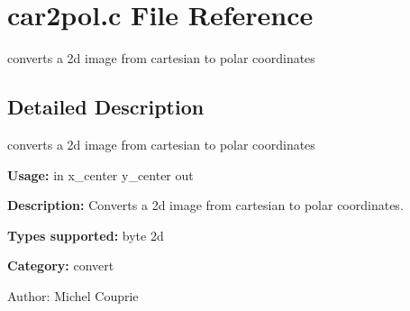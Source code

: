 \section{car2pol.c File Reference}
\label{car2pol_8c}
converts a 2d image from cartesian to polar coordinates 



\subsection{Detailed Description}
converts a 2d image from cartesian to polar coordinates 

{\bf Usage:} in x\_\-center y\_\-center out

{\bf Description:} Converts a 2d image from cartesian to polar coordinates.

{\bf Types supported:} byte 2d

{\bf Category:} convert

\begin{Desc}
\item[Author:]Michel Couprie \end{Desc}
